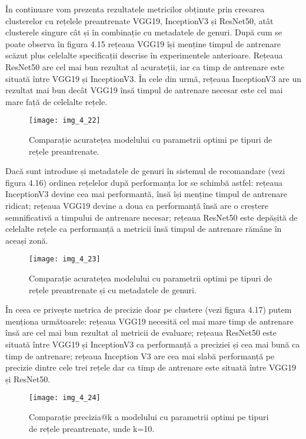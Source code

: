 \vspace{5mm}
În continuare vom prezenta rezultatele metricilor obținute prin creearea clusterelor cu rețelele preantrenate VGG19, InceptionV3 și ResNet50, atât clusterele singure cât și în combinație cu metadatele de genuri. După cum se poate observa în figura 4.15 rețeaua VGG19 își menține timpul de antrenare scăzut plus celelalte specificații descrise în experimentele anterioare. Rețeaua ResNet50 are cel mai bun rezultat al acurateții, iar ca timp de antrenare este situată între VGG19 și InceptionV3. În cele din urmă, rețeaua InceptionV3 are un rezultat mai bun decât VGG19 însă timpul de antrenare necesar este cel mai mare față de celelalte rețele.
\begin{figure}[!h]
	\centering
	\texttt{[image: img\_4\_22]}
	\caption[Comparație acuratețea modelului cu parametrii optimi pe tipuri de rețele preantrenate]{Comparație acuratețea modelului cu parametrii optimi pe tipuri de rețele preantrenate.}
\end{figure}

Dacă sunt introduse și metadatele de genuri în sistemul de recomandare (vezi figura 4.16) ordinea rețelelor după performanța lor se schimbă astfel: rețeaua InceptionV3 devine cea mai performantă, însă își menține timpul de antrenare ridicat; rețeaua VGG19 devine a doua ca performanță însă are o creștere semnificativă a timpului de antrenare necesar; rețeaua ResNet50 este depășită de celelalte rețele ca performanță a metricii însă timpul de antrenare rămâne în aceași zonă.
\begin{figure}[!h]
	\centering
	\texttt{[image: img\_4\_23]}
	\caption[Comparație acuratețea modelului cu parametrii optimi pe tipuri de rețele preantrenate și cu metadatele de genuri]{Comparație acuratețea modelului cu parametrii optimi pe tipuri de rețele preantrenate și cu metadatele de genuri.}
\end{figure}

În ceea ce privește metrica de precizie doar pe clustere (vezi figura 4.17) putem menționa următoarele: rețeaua VGG19 necesită cel mai mare timp de antrenare însă are cel mai bun rezultat al metricii de evaluare; rețeaua ResNet50 este situată între VGG19 și InceptionV3 ca performanță a preciziei și cea mai bună ca timp de antrenare; rețeaua Inception V3 are cea mai slabă performanță pe precizie dintre cele trei rețele dar ca timp de antrenare este situată între VGG19 și ResNet50.
\begin{figure}[!h]
	\centering
	\texttt{[image: img\_4\_24]}
	\caption[Comparație precizia@k a modelului cu parametrii optimi pe tipuri de rețele preantrenate]{Comparație precizia@k a modelului cu parametrii optimi pe tipuri de rețele preantrenate, unde k=10.}
\end{figure}

